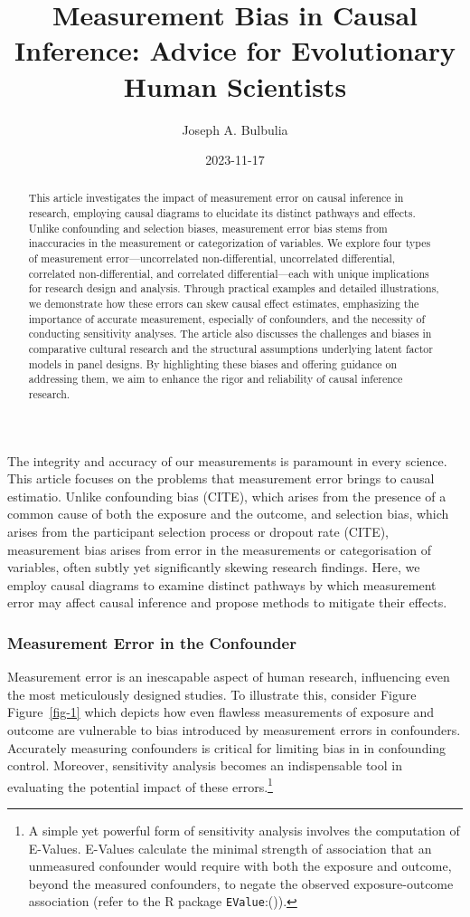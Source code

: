 \documentclass[
  singlecolumn,
  9pt]{article}
\title{Measurement Bias in Causal Inference: Advice for Evolutionary
Human Scientists}
\author{Joseph A. Bulbulia}
\affil{%
                  Victoria University of Wellington, New Zealand, School
                  of Psychology, Centre for Applied Cross-Cultural
                  Research
              }
\date{2023-11-17}
\begin{document}
\maketitle
\begin{abstract}
This article investigates the impact of measurement error on causal
inference in research, employing causal diagrams to elucidate its
distinct pathways and effects. Unlike confounding and selection biases,
measurement error bias stems from inaccuracies in the measurement or
categorization of variables. We explore four types of measurement
error---uncorrelated non-differential, uncorrelated differential,
correlated non-differential, and correlated differential---each with
unique implications for research design and analysis. Through practical
examples and detailed illustrations, we demonstrate how these errors can
skew causal effect estimates, emphasizing the importance of accurate
measurement, especially of confounders, and the necessity of conducting
sensitivity analyses. The article also discusses the challenges and
biases in comparative cultural research and the structural assumptions
underlying latent factor models in panel designs. By highlighting these
biases and offering guidance on addressing them, we aim to enhance the
rigor and reliability of causal inference research.
\end{abstract}
The integrity and accuracy of our measurements is paramount in every
science. This article focuses on the problems that measurement error
brings to causal estimatio. Unlike confounding bias (CITE), which arises
from the presence of a common cause of both the exposure and the
outcome, and selection bias, which arises from the participant selection
process or dropout rate (CITE), measurement bias arises from error in
the measurements or categorisation of variables, often subtly yet
significantly skewing research findings. Here, we employ causal diagrams
to examine distinct pathways by which measurement error may affect
causal inference and propose methods to mitigate their effects.

\subsubsection{Measurement Error in the
Confounder}\label{measurement-error-in-the-confounder}

Measurement error is an inescapable aspect of human research,
influencing even the most meticulously designed studies. To illustrate
this, consider Figure Figure~\ref{fig-1} which depicts how even flawless
measurements of exposure and outcome are vulnerable to bias introduced
by measurement errors in confounders. Accurately measuring confounders
is critical for limiting bias in in confounding control. Moreover,
sensitivity analysis becomes an indispensable tool in evaluating the
potential impact of these errors.\footnote{A simple yet powerful form of
  sensitivity analysis involves the computation of E-Values. E-Values
  calculate the minimal strength of association that an unmeasured
  confounder would require with both the exposure and outcome, beyond
  the measured confounders, to negate the observed exposure-outcome
  association (refer to the R package
  \texttt{EValue}:()).}
\end{document}
